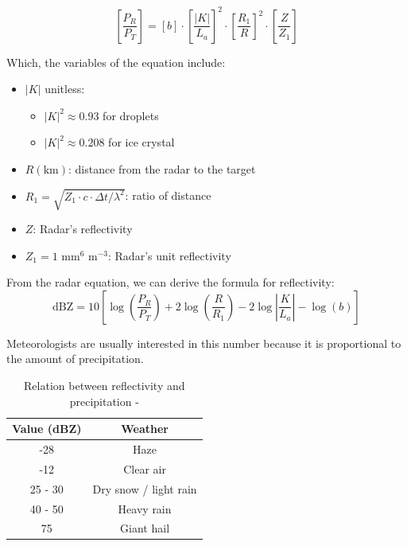 \[
    \left[ \frac{P_R}{P_T} \right]=\left[ b \right]\cdot\left[ \frac{|K|}{L_a} \right]^2\cdot\left[ \frac{R_1}{R} \right]^2\cdot\left[ \frac{Z}{Z_1} \right]
\]
\vspace{0.5cm}

Which, the variables of the equation include:
\begin{itemize}
    \item $|K|$ unitless:
          \begin{itemize}
              \item $|K|^2 \approx 0.93$ for droplets
              \item $|K|^2 \approx 0.208$ for ice crystal
          \end{itemize}
    \item $R (\text{km})$: distance from the radar to the target
    \item $R_1 = \sqrt{Z_1 \cdot c \cdot \Delta t / \lambda^2}$: ratio of
    distance
    \item $Z$: Radar's reflectivity
    \item $Z_1 = 1 \text{ mm}^6 \text{ m}^{-3}$: Radar's unit reflectivity
\end{itemize}

From the radar equation, we can derive the formula for reflectivity:
\vspace{0.5cm}
\[
    \text{dBZ} = 10\left[ \log\left( \frac{P_R}{P_T} \right) + 2 \log\left( \frac{R}{R_1} \right) - 2\log\left| \frac{K}{L_a} \right| - \log\left( b \right) \right]
\]
\vspace{0.5cm}

Meteorologists are usually interested in this number because it is proportional
to the amount of precipitation.
\vspace{0.5cm}

\begin{table}[h]
    \centering
    \begin{tabular}{|c|c|}
        \hline
        Value (dBZ) & Weather               \\
        \hline
        -28         & Haze                  \\
        -12         & Clear air             \\
        25 - 30     & Dry snow / light rain \\
        40 - 50     & Heavy rain            \\
        75          & Giant hail            \\
        \hline
    \end{tabular}
    \vspace{1em}
    \caption{ Relation between reflectivity and precipitation -
    \citet{2022Weather}}
\end{table}

